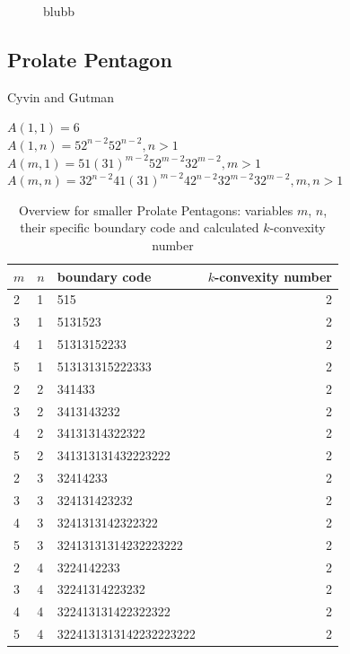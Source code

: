 \documentclass[a4paper,10pt]{article}
\begin{document}
{\begin{figure}
 \centering
 \begin{subfigure}{0.275\textwidth}
  \centering
  \caption{}
  \label{fig:}
 \end{subfigure}
 \begin{subfigure}{0.275\textwidth}
  \centering
  \caption{}
  \label{fig:}
 \end{subfigure}
 \begin{subfigure}{0.43\textwidth}
  \centering
  \caption{}
  \label{fig:}
 \end{subfigure}
 \caption{blubb}
\end{figure}



\subsection{Prolate Pentagon}

Cyvin and Gutman~\cite[p.~182]{cyvin_1988}

\cite{cyvin_1987}


$A(1,1) = 6$\\
$A(1,n) = 52^{n-2}52^{n-2}, n>1$\\
$A(m, 1) = 51(31)^{m-2}52^{m-2}32^{m-2}, m>1$\\
$A(m,n) = 32^{n-2}41(31)^{m-2}42^{n-2}32^{m-2}32^{m-2}, m,n>1$

\begin{table}
 \caption{Overview for smaller Prolate Pentagons: variables $m$, $n$, their specific boundary code and calculated $k$-convexity number}
 \medskip
 \begin{tabular}{|l l l r|}
 \hline
  $m$ & $n$ & boundary code & $k$-convexity number\\
  \hline
  2 & 1 & 515 & 2 \\
  3 & 1 & 5131523 & 2 \\
  4 & 1 & 51313152233 & 2 \\
  5 & 1 & 513131315222333 & 2 \\
  \hline
  2 & 2 & 341433 & 2 \\
  3 & 2 & 3413143232 & 2 \\
  4 & 2 & 34131314322322 & 2 \\
  5 & 2 & 341313131432223222 & 2 \\
  \hline
  2 & 3 & 32414233 & 2 \\
  3 & 3 & 324131423232 & 2 \\
  4 & 3 & 3241313142322322 & 2 \\
  5 & 3 & 32413131314232223222 & 2 \\
  \hline
  2 & 4 & 3224142233 & 2 \\
  3 & 4 & 32241314223232 & 2 \\
  4 & 4 & 322413131422322322 & 2 \\
  5 & 4 & 3224131313142232223222 & 2 \\
  \hline
 \end{tabular}
\end{table}

}
\end{document}
